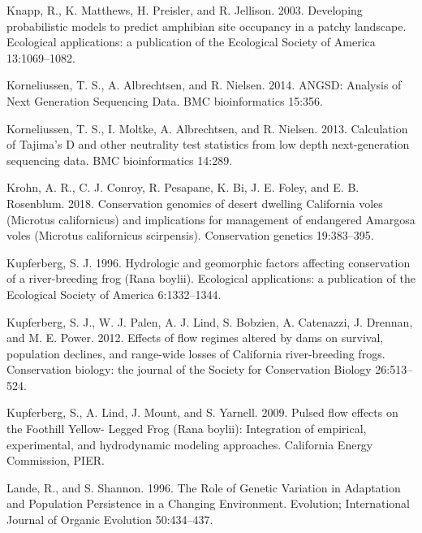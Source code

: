 \documentclass[proquest,12pt,final]{ucthesis-CA2012} %
\begin{document}
\begin{ucmainmatter}
\leavevmode\hypertarget{ref-knapp_developing_2003}{}%
Knapp, R., K. Matthews, H. Preisler, and R. Jellison. 2003. Developing
probabilistic models to predict amphibian site occupancy in a patchy
landscape. Ecological applications: a publication of the Ecological
Society of America 13:1069--1082.

\leavevmode\hypertarget{ref-korneliussen_angsd_2014}{}%
Korneliussen, T. S., A. Albrechtsen, and R. Nielsen. 2014. ANGSD:
Analysis of Next Generation Sequencing Data. BMC bioinformatics 15:356.

\leavevmode\hypertarget{ref-korneliussen_calculation_2013}{}%
Korneliussen, T. S., I. Moltke, A. Albrechtsen, and R. Nielsen. 2013.
Calculation of Tajima's D and other neutrality test statistics from low
depth next-generation sequencing data. BMC bioinformatics 14:289.

\leavevmode\hypertarget{ref-krohn_conservation_2018}{}%
Krohn, A. R., C. J. Conroy, R. Pesapane, K. Bi, J. E. Foley, and E. B.
Rosenblum. 2018. Conservation genomics of desert dwelling California
voles (Microtus californicus) and implications for management of
endangered Amargosa voles (Microtus californicus scirpensis).
Conservation genetics 19:383--395.

\leavevmode\hypertarget{ref-kupferberg_hydrologic_1996}{}%
Kupferberg, S. J. 1996. Hydrologic and geomorphic factors affecting
conservation of a river-breeding frog (Rana boylii). Ecological
applications: a publication of the Ecological Society of America
6:1332--1344.

\leavevmode\hypertarget{ref-kupferberg_effects_2012}{}%
Kupferberg, S. J., W. J. Palen, A. J. Lind, S. Bobzien, A. Catenazzi, J.
Drennan, and M. E. Power. 2012. Effects of flow regimes altered by dams
on survival, population declines, and range-wide losses of California
river-breeding frogs. Conservation biology: the journal of the Society
for Conservation Biology 26:513--524.

\leavevmode\hypertarget{ref-kupferberg_pulsed_2009}{}%
Kupferberg, S., A. Lind, J. Mount, and S. Yarnell. 2009. Pulsed flow
effects on the Foothill Yellow- Legged Frog (Rana boylii): Integration
of empirical, experimental, and hydrodynamic modeling approaches.
California Energy Commission, PIER.

\leavevmode\hypertarget{ref-lande_role_1996}{}%
Lande, R., and S. Shannon. 1996. The Role of Genetic Variation in
Adaptation and Population Persistence in a Changing Environment.
Evolution; International Journal of Organic Evolution 50:434--437.


\end{ucmainmatter}
\end{document}
